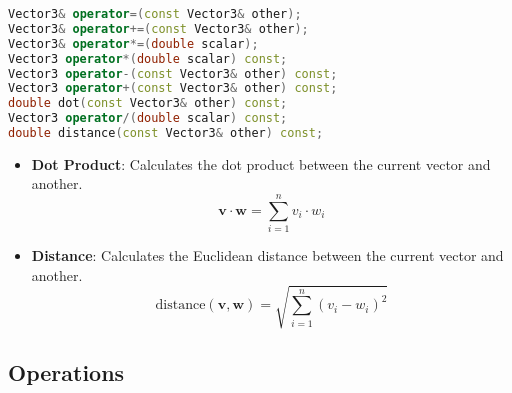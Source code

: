 \begin{minipage}[t]{0.5\linewidth}
    \begin{lstlisting}[language=C++, caption={Vector3 Operators}]
Vector3& operator=(const Vector3& other);
Vector3& operator+=(const Vector3& other);
Vector3& operator*=(double scalar);
Vector3 operator*(double scalar) const;
Vector3 operator-(const Vector3& other) const; 
Vector3 operator+(const Vector3& other) const; 
double dot(const Vector3& other) const;
Vector3 operator/(double scalar) const;
double distance(const Vector3& other) const;
    \end{lstlisting}
\end{minipage}%
\begin{minipage}[t]{0.5\linewidth}
    \begin{itemize}

    \item \textbf{Dot Product}: Calculates the dot product between the current vector and another.
\[
\mathbf{v} \cdot \mathbf{w} = \sum_{i=1}^{n} v_i \cdot w_i
\]

    \item \textbf{Distance}: Calculates the Euclidean distance between the current vector and another.
\[
\text{distance}(\mathbf{v}, \mathbf{w}) = \sqrt{\sum_{i=1}^{n} (v_i - w_i)^2}
\]
    \end{itemize}
\end{minipage}







\pagebreak










\subsection*{Operations}

